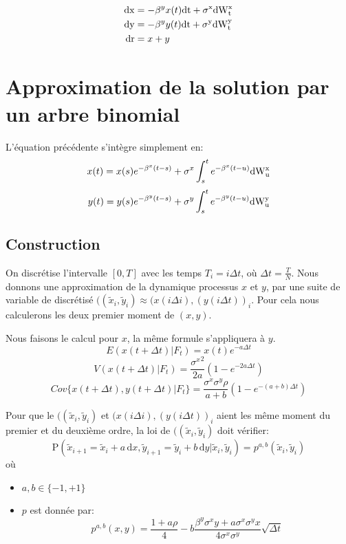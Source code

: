 \begin{align*}
  \rm{d}x &= -\beta^y x(t) \rm{d}t + \sigma^x \rm{d}W^x_t \\
  \rm{d}y &= -\beta^y y(t) \rm{d}t + \sigma^y \rm{d}W^y_t \\
  \rm{d}r &= x + y
\end{align*}


\section{Approximation de la solution par un arbre binomial}

L'équation précédente s'intègre simplement en:
$$x(t) = x(s) e^{-\beta^x (t-s)} +  \sigma^x \int_s^t e^{- \beta^x (t-u)} \rm{d} W^x_u $$
$$y(t) = y(s) e^{-\beta^y (t-s)} +  \sigma^y \int_s^t e^{- \beta^y (t-u)} \rm{d} W^y_u $$

\subsection*{Construction}

On discrétise l’intervalle $[0, T]$ avec les temps $T_i = i \Delta t$, où $\Delta t = \frac{T}{N}$.
Nous donnons une approximation de la dynamique processus $x$ et $y$, par une suite de variable de discrétisé $((\widetilde{x}_i, \widetilde{y}_i) \approx (x(i \Delta i), (y(i \Delta t))_i $. Pour cela nous calculerons les deux premier moment de $(x, y)$.

Nous faisons le calcul pour $x$, la même formule s'appliquera à $y$.
$$E(x(t+\Delta t) | F_t) = x(t) e^{-a \Delta t}$$
$$V(x(t+\Delta t) | F_t) = \frac{{\sigma^x}^2}{2a} (1 - e^{-2a \Delta t})$$
$$Cov\{x(t+\Delta t), y(t+\Delta t) | F_t \} = \frac{\sigma^x \sigma^y \rho}{a + b} (1-e^{-(a+b)\Delta t})$$

Pour que le $((\widetilde{x}_i, \widetilde{y}_i)$ et $(x(i \Delta i), (y(i \Delta t))_i $ aient les même moment du premier et du deuxième ordre, la loi de  $((\widetilde{x}_i, \widetilde{y}_i)$  doit vérifier:
$$\mathrm{P} \left( \widetilde{x}_{i+1} = \widetilde{x}_i + a \, \mathrm{d}x, \widetilde{y}_{i+1} = \widetilde{y}_i + b \, \mathrm{d}y |  \widetilde{x}_i, \widetilde{y}_i \right) = p^{a, b}( \widetilde{x}_i, \widetilde{y}_i)$$
où 
\begin{itemize}
\item $a, b \in \{-1, +1\}$
\item $p$ est donnée par:
$$ p^{a, b}(x, y) = \frac{1 + a \rho}{4} - b \frac{\beta^y \sigma^x y + a \sigma^x \sigma^y  x}{4 \sigma^x \sigma^y} \sqrt{\Delta t} $$
\end{itemize}

